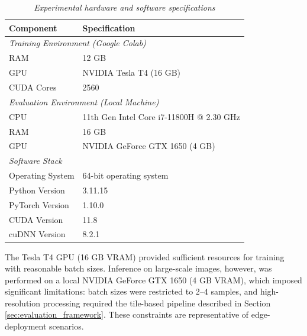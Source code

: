 \begin{table}[htbp]
    \centering
    \caption{\textit{Experimental hardware and software specifications}}
    \label{tab:hardware_specs}
    \begin{tabular}{l p{}}
        \toprule
        \textbf{Component}       & \textbf{Specification}                   \\
        \midrule
        \multicolumn{2}{l}{\textit{Training Environment (Google Colab)}}    \\
        \midrule
        RAM                      & 12 GB                                    \\
        GPU                      & NVIDIA Tesla T4 (16 GB)                  \\
        CUDA Cores               & 2560                                     \\
        \multicolumn{2}{l}{\textit{Evaluation Environment (Local Machine)}} \\
        \midrule
        CPU                      & 11th Gen Intel Core i7-11800H @ 2.30 GHz \\
        RAM                      & 16 GB                                    \\
        GPU                      & NVIDIA GeForce GTX 1650 (4 GB)           \\
        \multicolumn{2}{l}{\textit{Software Stack}}                         \\
        \midrule
        Operating System         & 64-bit operating system                  \\
        Python Version           & 3.11.15                                  \\
        PyTorch Version          & 1.10.0                                   \\
        CUDA Version             & 11.8                                     \\
        cuDNN Version            & 8.2.1                                    \\
        \bottomrule
    \end{tabular}
\end{table}

\hs The Tesla T4 GPU (16 GB VRAM) provided sufficient resources for training with reasonable batch sizes. Inference on large-scale images, however, was performed on a local NVIDIA GeForce GTX 1650 (4 GB VRAM), which imposed significant limitations: batch sizes were restricted to 2--4 samples, and high-resolution processing required the tile-based pipeline described in Section \ref{sec:evaluation_framework}. These constraints are representative of edge-deployment scenarios.

